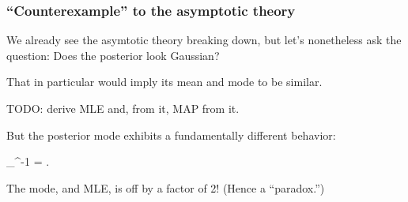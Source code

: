 \documentclass[18pt]{beamer}
\newcommand{\defineTightItemizeSpacing}{%
	\setlength{\abovedisplayskip}{.25\baselineskip}%
	\setlength{\belowdisplayskip}{.25\baselineskip}%
}
\newenvironment{tightEquation*}{%
	\defineTightItemizeSpacing%
	\begin{equation*}
}{
	\end{equation*} \ignorespacesafterend
}
\newcommand{\given}{\thinnerspace | \thinnerspace}
\newcommand{\thinnerspace}{\mskip.5\thinmuskip}
\newcommand{\map}[1]{\widehat{#1}_{\scriptscriptstyle \mathrm{MAP}}}
\begin{document}
\begin{frame}
\frametitle{``Counterexample'' to the asymptotic theory}
We already see the asymtotic theory breaking down, but let's nonetheless ask the question: Does the posterior look Gaussian?

\pause%
\smallskip
That in particular would imply its mean and mode to be similar.

\pause
\smallskip
TODO: derive MLE and, from it, MAP from it.

\pause%
\smallskip
But the posterior mode exhibits a fundamentally different behavior:
\begin{tightEquation*}
\map{\phi}^{-1} = .
\end{tightEquation*}

\pause%
The mode, and {\small MLE}, is off by a factor of 2! (Hence a ``paradox.'')
\end{frame}
\end{document}
